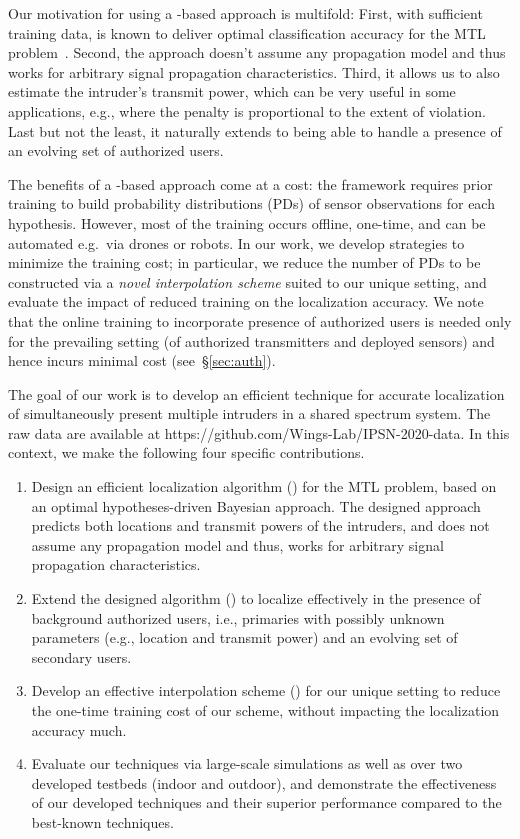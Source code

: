   Our motivation for using a \map-based
approach is multifold: First, with sufficient training data, \map is
known to deliver optimal classification accuracy for the MTL problem~\cite{map-optimal}.
Second, the \map approach doesn't assume any propagation model and
thus works for arbitrary signal propagation characteristics. Third, it
allows us to also estimate the intruder's transmit power, which can be
very useful in some applications, e.g., where the penalty is
proportional to the extent of violation. Last but not the least,
it naturally extends to being able to handle a presence of an evolving
set of authorized users.

  The benefits of a \map-based
approach come at a cost: the \map framework requires prior training to
build probability distributions (PDs) of sensor observations for each
hypothesis. However, most of the training occurs offline, one-time,
and can be automated e.g.\ via drones or robots.  In our work, we
develop strategies to minimize the training cost; in particular, we
reduce the number of PDs to be constructed via a {\em novel interpolation
scheme} suited to our unique setting, and evaluate the impact of
reduced training on the localization accuracy.
We note that the online training to incorporate presence of authorized
users is needed only for the prevailing setting (of authorized
transmitters and deployed sensors) and hence incurs minimal cost
(see~\S\ref{sec:auth}).

  The goal of our work is to develop an
efficient technique for accurate localization of simultaneously
present multiple intruders in a shared spectrum system. The raw data are available at https://github.com/Wings-Lab/IPSN-2020-data. In this
context, we make the following four specific contributions. 
\begin{enumerate}
\item
Design an efficient localization algorithm (\ouralgo) for the MTL
problem, based on an optimal hypotheses-driven Bayesian approach. The
designed approach predicts both locations and transmit powers of the
intruders, and does not assume any propagation model and thus, works
for arbitrary signal propagation characteristics.

\item
Extend the designed algorithm (\ouralgoss) to localize effectively in
the presence of background authorized users, i.e., primaries with
possibly unknown parameters (e.g., location and transmit power) and an
evolving set of secondary users.

\item
Develop an effective interpolation scheme (\ildw) for our unique
setting to reduce the one-time training cost of our scheme, without
impacting the localization accuracy much.

\item
Evaluate our techniques via large-scale simulations as well as over
two developed testbeds (indoor and outdoor), and demonstrate the
effectiveness of our developed techniques and their superior
performance compared to the best-known techniques.
\end{enumerate}

